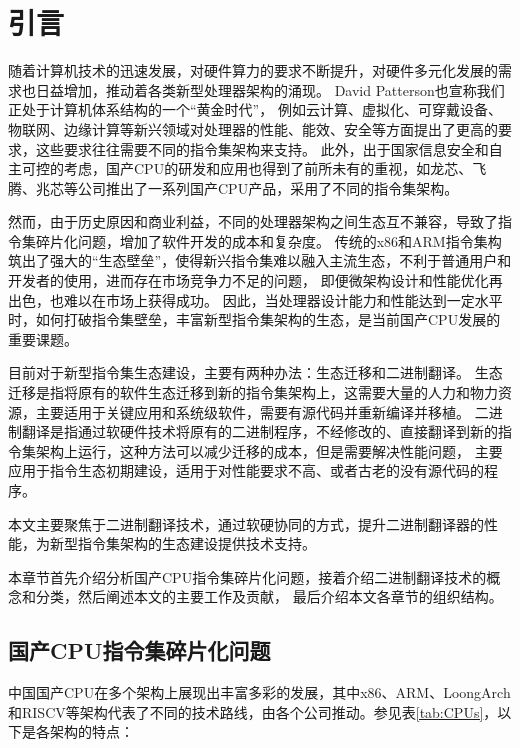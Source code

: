 \chapter{引言}\label{chap:introduction}


随着计算机技术的迅速发展，对硬件算力的要求不断提升，对硬件多元化发展的需求也日益增加，推动着各类新型处理器架构的涌现。
David Patterson也宣称我们正处于计算机体系结构的一个“黄金时代”\cite{goldenage}，
例如云计算、虚拟化、可穿戴设备、物联网、边缘计算等新兴领域对处理器的性能、能效、安全等方面提出了更高的要求，这些要求往往需要不同的指令集架构来支持。
此外，出于国家信息安全和自主可控的考虑，国产CPU的研发和应用也得到了前所未有的重视，如龙芯、飞腾、兆芯等公司推出了一系列国产CPU产品，采用了不同的指令集架构。

然而，由于历史原因和商业利益，不同的处理器架构之间生态互不兼容，导致了指令集碎片化问题，增加了软件开发的成本和复杂度。
传统的x86和ARM指令集构筑出了强大的“生态壁垒”，使得新兴指令集难以融入主流生态，不利于普通用户和开发者的使用，进而存在市场竞争力不足的问题，
即便微架构设计和性能优化再出色，也难以在市场上获得成功。
因此，当处理器设计能力和性能达到一定水平时，如何打破指令集壁垒，丰富新型指令集架构的生态，是当前国产CPU发展的重要课题。

目前对于新型指令集生态建设，主要有两种办法：生态迁移和二进制翻译。
生态迁移是指将原有的软件生态迁移到新的指令集架构上，这需要大量的人力和物力资源，主要适用于关键应用和系统级软件，需要有源代码并重新编译并移植。
二进制翻译是指通过软硬件技术将原有的二进制程序，不经修改的、直接翻译到新的指令集架构上运行，这种方法可以减少迁移的成本，但是需要解决性能问题，
主要应用于指令生态初期建设，适用于对性能要求不高、或者古老的没有源代码的程序。

本文主要聚焦于二进制翻译技术，通过软硬协同的方式，提升二进制翻译器的性能，为新型指令集架构的生态建设提供技术支持。

本章节首先介绍分析国产CPU指令集碎片化问题，接着介绍二进制翻译技术的概念和分类，然后阐述本文的主要工作及贡献，
最后介绍本文各章节的组织结构。

\section{国产CPU指令集碎片化问题}

中国国产CPU在多个架构上展现出丰富多彩的发展，其中x86、ARM、LoongArch\cite{LoongArch2023}和RISCV等架构代表了不同的技术路线，由各个公司推动。参见表\ref{tab:CPUs}，以下是各架构的特点：


